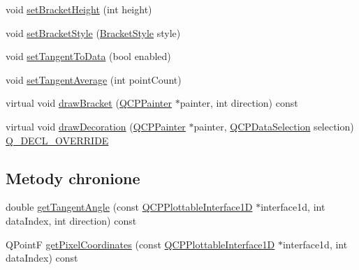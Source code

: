 \begin{DoxyCompactItemize}
void \hyperlink{class_q_c_p_selection_decorator_bracket_aed773ad737201cca40efc6fe451acad8}{set\+Bracket\+Height} (int height)
\item 
void \hyperlink{class_q_c_p_selection_decorator_bracket_a04507697438f6ad8cc2aeea5422dcbe5}{set\+Bracket\+Style} (\hyperlink{class_q_c_p_selection_decorator_bracket_aa6d18517ec0553575bbef0de4252336e}{Bracket\+Style} style)
\item 
void \hyperlink{class_q_c_p_selection_decorator_bracket_a93bc6086e53a5e40a08641a7b2e2cdd5}{set\+Tangent\+To\+Data} (bool enabled)
\item 
void \hyperlink{class_q_c_p_selection_decorator_bracket_adb2d0876f25a77c88042b70818f1d6e4}{set\+Tangent\+Average} (int point\+Count)
\item 
virtual void \hyperlink{class_q_c_p_selection_decorator_bracket_a8153966498e2a8d4c11c681e06d7d692}{draw\+Bracket} (\hyperlink{class_q_c_p_painter}{Q\+C\+P\+Painter} $\ast$painter, int direction) const 
\item 
virtual void \hyperlink{class_q_c_p_selection_decorator_bracket_a9ebe2e729b5012c0a995d788f87fac22}{draw\+Decoration} (\hyperlink{class_q_c_p_painter}{Q\+C\+P\+Painter} $\ast$painter, \hyperlink{class_q_c_p_data_selection}{Q\+C\+P\+Data\+Selection} selection) \hyperlink{qcustomplot_8hh_a42cc5eaeb25b85f8b52d2a4b94c56f55}{Q\+\_\+\+D\+E\+C\+L\+\_\+\+O\+V\+E\+R\+R\+I\+DE}
\end{DoxyCompactItemize}
\subsection*{Metody chronione}
\begin{DoxyCompactItemize}
\item 
double \hyperlink{class_q_c_p_selection_decorator_bracket_afa0dedceebf14787e4224ddecb0ed7cd}{get\+Tangent\+Angle} (const \hyperlink{class_q_c_p_plottable_interface1_d}{Q\+C\+P\+Plottable\+Interface1D} $\ast$interface1d, int data\+Index, int direction) const 
\item 
Q\+PointF \hyperlink{class_q_c_p_selection_decorator_bracket_aba1d088001663f3a1c367aab59793773}{get\+Pixel\+Coordinates} (const \hyperlink{class_q_c_p_plottable_interface1_d}{Q\+C\+P\+Plottable\+Interface1D} $\ast$interface1d, int data\+Index) const 
\end{DoxyCompactItemize}
